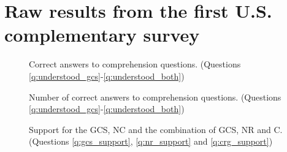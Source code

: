 \clearpage
\section{Raw results from the first U.S. complementary survey}\label{app:raw_results_US1}

\begin{figure}[h!]
    \caption{Correct answers to comprehension questions. (Questions \ref{q:understood_gcs}-\ref{q:understood_both})}\label{fig:understood_each}
\end{figure}

\begin{figure}[h!]
    \caption{Number of correct answers to comprehension questions. (Questions \ref{q:understood_gcs}-\ref{q:understood_both})}\label{fig:understood_score}
\end{figure}

\begin{figure}[h!]
    \caption{Support for the GCS, NC and the combination of GCS, NR and C. (Questions \ref{q:gcs_support}, \ref{q:nr_support} and \ref{q:crg_support})}\label{fig:support_binary}
\end{figure}

